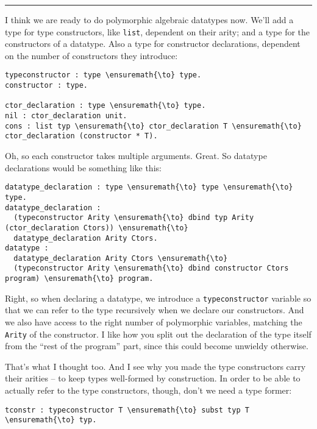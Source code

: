 \begin{center}\rule{0.5\linewidth}{\linethickness}\end{center}

\heroADVISOR{} I think we are ready to do polymorphic algebraic datatypes now.
We'll add a type for type constructors, like \texttt{list}, dependent on
their arity; and a type for the constructors of a datatype. Also a type
for constructor declarations, dependent on the number of constructors
they introduce:

\begin{verbatim}
typeconstructor : type \ensuremath{\to} type.
constructor : type.

ctor_declaration : type \ensuremath{\to} type.
nil : ctor_declaration unit.
cons : list typ \ensuremath{\to} ctor_declaration T \ensuremath{\to} ctor_declaration (constructor * T).
\end{verbatim}

\heroSTUDENT{} Oh, so each constructor takes multiple arguments. Great. So
datatype declarations would be something like this:

\begin{verbatim}
datatype_declaration : type \ensuremath{\to} type \ensuremath{\to} type.
datatype_declaration : 
  (typeconstructor Arity \ensuremath{\to} dbind typ Arity (ctor_declaration Ctors)) \ensuremath{\to}
  datatype_declaration Arity Ctors.
datatype :
  datatype_declaration Arity Ctors \ensuremath{\to}
  (typeconstructor Arity \ensuremath{\to} dbind constructor Ctors program) \ensuremath{\to} program.
\end{verbatim}

\heroADVISOR{} Right, so when declaring a datatype, we introduce a
\texttt{typeconstructor} variable so that we can refer to the type
recursively when we declare our constructors. And we also have access to
the right number of polymorphic variables, matching the \texttt{Arity}
of the constructor. I like how you split out the declaration of the type
itself from the ``rest of the program'' part, since this could become
unwieldy otherwise.

\heroSTUDENT{} That's what I thought too. And I see why you made the type
constructors carry their arities -- to keep types well-formed by
construction. In order to be able to actually refer to the type
constructors, though, don't we need a type former:

\begin{verbatim}
tconstr : typeconstructor T \ensuremath{\to} subst typ T \ensuremath{\to} typ.
\end{verbatim}

